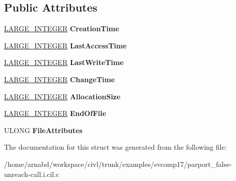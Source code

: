 \subsection*{Public Attributes}
\begin{DoxyCompactItemize}
\item 
\hypertarget{struct__FILE__NETWORK__OPEN__INFORMATION_a0c43dfa3180a99d38a362ef5da3e1f6c}{}\hyperlink{union__LARGE__INTEGER}{L\+A\+R\+G\+E\+\_\+\+I\+N\+T\+E\+G\+E\+R} {\bfseries Creation\+Time}\label{struct__FILE__NETWORK__OPEN__INFORMATION_a0c43dfa3180a99d38a362ef5da3e1f6c}

\item 
\hypertarget{struct__FILE__NETWORK__OPEN__INFORMATION_a9aa071fe1d3074e7544b6f938012a7d0}{}\hyperlink{union__LARGE__INTEGER}{L\+A\+R\+G\+E\+\_\+\+I\+N\+T\+E\+G\+E\+R} {\bfseries Last\+Access\+Time}\label{struct__FILE__NETWORK__OPEN__INFORMATION_a9aa071fe1d3074e7544b6f938012a7d0}

\item 
\hypertarget{struct__FILE__NETWORK__OPEN__INFORMATION_ab50993c21c768a2795e3e796fd63c91f}{}\hyperlink{union__LARGE__INTEGER}{L\+A\+R\+G\+E\+\_\+\+I\+N\+T\+E\+G\+E\+R} {\bfseries Last\+Write\+Time}\label{struct__FILE__NETWORK__OPEN__INFORMATION_ab50993c21c768a2795e3e796fd63c91f}

\item 
\hypertarget{struct__FILE__NETWORK__OPEN__INFORMATION_ab6d582dcc02c01dd5d8d8eeccda63023}{}\hyperlink{union__LARGE__INTEGER}{L\+A\+R\+G\+E\+\_\+\+I\+N\+T\+E\+G\+E\+R} {\bfseries Change\+Time}\label{struct__FILE__NETWORK__OPEN__INFORMATION_ab6d582dcc02c01dd5d8d8eeccda63023}

\item 
\hypertarget{struct__FILE__NETWORK__OPEN__INFORMATION_a09330849bec043939660270401f5d4b9}{}\hyperlink{union__LARGE__INTEGER}{L\+A\+R\+G\+E\+\_\+\+I\+N\+T\+E\+G\+E\+R} {\bfseries Allocation\+Size}\label{struct__FILE__NETWORK__OPEN__INFORMATION_a09330849bec043939660270401f5d4b9}

\item 
\hypertarget{struct__FILE__NETWORK__OPEN__INFORMATION_a6d5128d3a1662f74c45b6fb90d53f04c}{}\hyperlink{union__LARGE__INTEGER}{L\+A\+R\+G\+E\+\_\+\+I\+N\+T\+E\+G\+E\+R} {\bfseries End\+Of\+File}\label{struct__FILE__NETWORK__OPEN__INFORMATION_a6d5128d3a1662f74c45b6fb90d53f04c}

\item 
\hypertarget{struct__FILE__NETWORK__OPEN__INFORMATION_a8480c0064af081ed3ff798611b4cde40}{}U\+L\+O\+N\+G {\bfseries File\+Attributes}\label{struct__FILE__NETWORK__OPEN__INFORMATION_a8480c0064af081ed3ff798611b4cde40}

\end{DoxyCompactItemize}


The documentation for this struct was generated from the following file\+:\begin{DoxyCompactItemize}
\item 
/home/arnabd/workspace/civl/trunk/examples/svcomp17/parport\+\_\+false-\/unreach-\/call.\+i.\+cil.\+c\end{DoxyCompactItemize}
